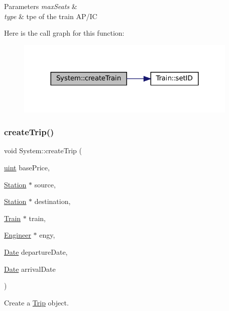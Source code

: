 \begin{DoxyParams}{Parameters}
{\em max\+Seats} & \\
\hline
{\em type} & tpe of the train A\+P/\+IC \\
\hline
\end{DoxyParams}
Here is the call graph for this function\+:
\nopagebreak
\begin{figure}[H]
\begin{center}
\leavevmode
\includegraphics[width=300pt]{classSystem_a0eb9c67e05902a014cf37e8ce1ad2ee3_cgraph}
\end{center}
\end{figure}
\mbox{\label{classSystem_a6ce652f45a3883db7b3cce145b25585c}} 
\subsubsection{\texorpdfstring{create\+Trip()}{createTrip()}}
{\footnotesize\ttfamily void System\+::create\+Trip (\begin{DoxyParamCaption}\item[{\mbox{\hyperlink{project__utils_8h_a91ad9478d81a7aaf2593e8d9c3d06a14}{uint}}}]{base\+Price,  }\item[{\mbox{\hyperlink{classStation}{Station}} $\ast$}]{source,  }\item[{\mbox{\hyperlink{classStation}{Station}} $\ast$}]{destination,  }\item[{\mbox{\hyperlink{classTrain}{Train}} $\ast$}]{train,  }\item[{\mbox{\hyperlink{classEngineer}{Engineer}} $\ast$}]{engy,  }\item[{\mbox{\hyperlink{classDate}{Date}}}]{departure\+Date,  }\item[{\mbox{\hyperlink{classDate}{Date}}}]{arrival\+Date }\end{DoxyParamCaption})}



Create a \mbox{\hyperlink{classTrip}{Trip}} object. 

